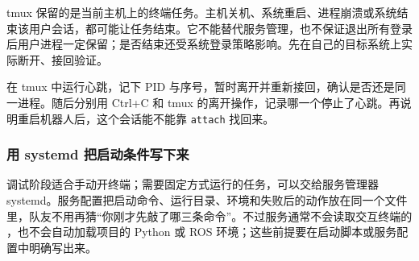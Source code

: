 \begin{note}
tmux 保留的是当前主机上的终端任务。主机关机、系统重启、进程崩溃或系统结束该用户会话，都可能让任务结束。它不能替代服务管理，也不保证退出所有登录后用户进程一定保留；是否结束还受系统登录策略影响。先在自己的目标系统上实际断开、接回验证。
\end{note}

\begin{exercise}\label{ex:deploy-tmux}
在 tmux 中运行心跳，记下 PID 与序号，暂时离开并重新接回，确认是否还是同一进程。随后分别用 Ctrl+C 和 tmux 的离开操作，记录哪一个停止了心跳。再说明重启机器人后，这个会话能不能靠 \texttt{attach} 找回来。
\end{exercise}

\subsubsection{用 systemd 把启动条件写下来}

调试阶段适合手动开终端；需要固定方式运行的任务，可以交给服务管理器 systemd。服务配置把启动命令、运行目录、环境和失败后的动作放在同一个文件里，队友不用再猜“你刚才先敲了哪三条命令”。不过服务通常不会读取交互终端的 ，也不会自动加载项目的 Python 或 ROS 环境；这些前提要在启动脚本或服务配置中明确写出来。

